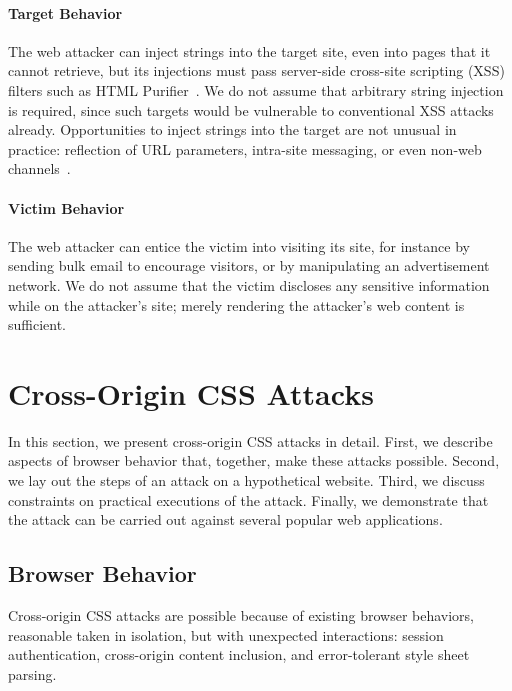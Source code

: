 \documentclass{sig-alternate}
\begin{document}
\paragraph{Target Behavior}
The web attacker can inject strings into the target site, even into
pages that it cannot retrieve, but its injections must pass server-side
cross-site scripting (XSS) filters such as HTML
Purifier~\cite{htmlpurifier}.  We do not assume that arbitrary string
injection is required, since such targets would be vulnerable to
conventional XSS attacks already.  Opportunities to inject strings
into the target are not unusual in practice: reflection of URL
parameters, intra-site messaging, or even non-web channels~\cite{xcs}.

\paragraph{Victim Behavior}
The web attacker can entice the victim into visiting its site, for
instance by sending bulk email to encourage visitors, or by
manipulating an advertisement network. We do not assume that the
victim discloses any sensitive information while on the attacker's
site; merely rendering the attacker's web content is sufficient.

\section{Cross-Origin CSS Attacks} \label{sec:attacks}

In this section, we present cross-origin CSS attacks in detail.
First, we describe aspects of browser behavior that, together,
make these attacks possible.  Second, we lay out the steps of an
attack on a hypothetical website.  Third, we discuss constraints on
practical executions of the attack.  Finally, we demonstrate that the
attack can be carried out against several popular web applications.

\subsection{Browser Behavior} \label{sec:behavior}

Cross-origin CSS attacks are possible because of existing browser
behaviors, reasonable taken in isolation, but with unexpected
interactions: session authentication, cross-origin content inclusion,
and error-tolerant style sheet parsing.
\end{document}
